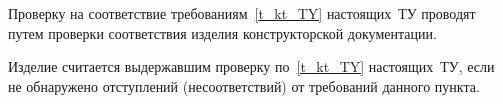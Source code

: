 Проверку на соответствие требованиям~\ref{t_kt_TY} настоящих~ТУ проводят путем проверки  соответствия изделия конструкторской документации.
	
Изделие считается выдержавшим проверку по~\ref{t_kt_TY} настоящих~ТУ, если не обнаружено отступлений (несоответствий) от требований данного пункта.